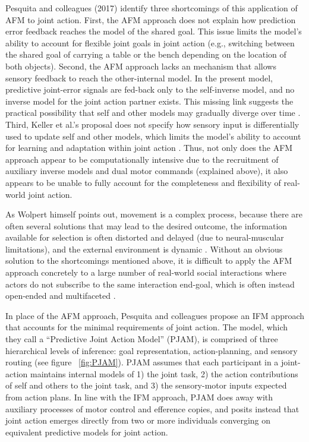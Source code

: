 \begin{CJK}{UTF8}{gbsn}
Pesquita and colleagues (2017) identify three shortcomings of this application of AFM to joint action.  First, the AFM approach does not explain how prediction error feedback reaches the model of the shared goal.  This issue limits the model’s ability to account for flexible joint goals in joint action (e.g., switching between the shared goal of carrying a table or the bench depending on the location of both objects).  Second, the AFM approach lacks an mechanism that allows sensory feedback to reach the other-internal model. In the present model, predictive joint-error signals are fed-back only to the self-inverse model, and no inverse model for the joint action partner exists. This missing link suggests the practical possibility that self and other models may gradually diverge over time \citep{Pickering2014}.  Third, Keller et al.’s proposal does not specify how sensory input is differentially used to update self and other models, which limits the model's ability to account for learning and adaptation within joint action \citep{Pesquita2017}.  Thus, not only does the AFM approach appear to be computationally intensive due to the recruitment of auxiliary inverse models and dual motor commands (explained above), it also appears to be unable to fully account for the completeness and flexibility of real-world joint action.

As Wolpert himself points out, movement is a complex process, because there are often several solutions that may lead to the desired outcome, the information available for selection is often distorted and delayed (due to neural-muscular limitations), and the external environment is dynamic \citep{Wolpert1997}. Without an obvious solution to the shortcomings mentioned above, it is difficult to apply the AFM approach concretely to a large number of real-world social interactions where actors do not subscribe to the same interaction end-goal, which is often instead open-ended and multifaceted \citep{Pesquita2017}.

In place of the AFM approach, Pesquita and colleagues \textcite{Pesquita2017} propose an IFM approach that accounts for the minimal requirements of joint action.  The model, which they call a ``Predictive Joint Action Model'' (PJAM), is comprised of three hierarchical levels of inference: goal representation, action-planning, and sensory routing (see figure ~\ref{fig:PJAM}). PJAM assumes that each participant in a joint-action maintains internal models of 1) the joint task, 2) the action contributions of self and others to the joint task, and  3) the sensory-motor inputs expected from action plans.  In line with the IFM approach, PJAM does away with auxiliary processes of motor control and efference copies, and posits instead that joint action emerges directly from two or more individuals converging on equivalent predictive models for joint action.


\end{CJK}
